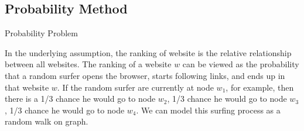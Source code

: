 \documentclass{beamer}
\begin{document}

\subsection{Probability Method}
\begin{frame}[t]{Probability Problem}
    \begin{outline}
        \1 In the underlying assumption, the ranking of website is the relative relationship between all websites. 
        \1 The ranking of a website $w$ can be viewed as the probability that a random surfer opens the browser, starts following links, and ends up in that website $w$.
        \1 If the random surfer are currently at node $w_1$, for example, then there is a 1/3 chance he would go to node $w_2$, 1/3 chance he would go to node $w_3$, 1/3 chance he would go to node $w_4$. 
        \1 We can model this surfing process as a random walk on graph. 
    \end{outline}
\end{frame}
\end{document}
